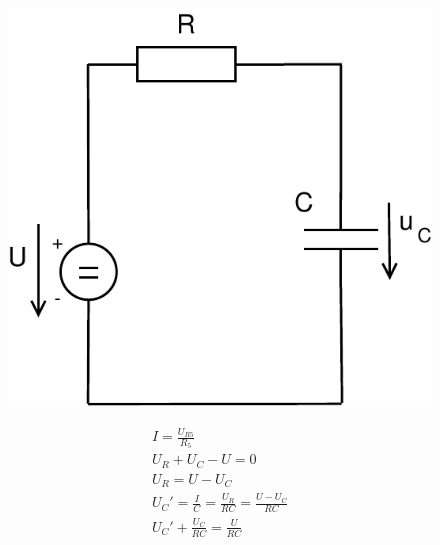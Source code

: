 \documentclass[12pt,a4paper]{article}
\begin{document}
\begin{minipage}{\linewidth}
      \centering
      \begin{minipage}{0.45\linewidth}
          \begin{figure}[H]
              \includegraphics[width=\linewidth]{Circuits/5-A.pdf}
          \end{figure}
      \end{minipage}
      \hspace{0.05\linewidth}
      \begin{minipage}{0.45\linewidth}
          	\begin{align*}
       			I = \frac{U_{R5}}{R_5}  \\[5mm]
       			U_R + U_C - U = 0  \\
       			U_R = U - U_C  \\[5mm]
       			U_C' = \frac{I}{C} = \frac{U_R}{RC} = \frac{U - U_C}{RC}  \\[5mm]
       			U_C' + \frac{U_C}{RC} = \frac{U}{RC}
		\end{align*}
      \end{minipage}
  \end{minipage}
  
  \vspace{1cm}
  
\end{document}
